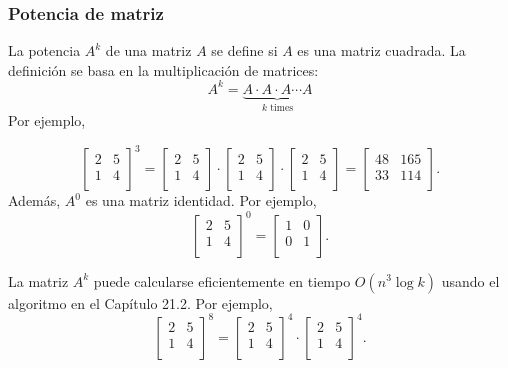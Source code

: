 \subsubsection{Potencia de matriz}


La potencia $A^k$ de una matriz $A$ se define
si $A$ es una matriz cuadrada.
La definición se basa en la multiplicación de matrices:
\[ A^k = \underbrace{A \cdot A \cdot A \cdots A}_{\textrm{$k$ times}} \]
Por ejemplo,

\[
 \begin{bmatrix}
  2 & 5 \\
  1 & 4 \\
 \end{bmatrix}^3 =
 \begin{bmatrix}
  2 & 5 \\
  1 & 4 \\
 \end{bmatrix} \cdot
 \begin{bmatrix}
  2 & 5 \\
  1 & 4 \\
 \end{bmatrix} \cdot
 \begin{bmatrix}
  2 & 5 \\
  1 & 4 \\
 \end{bmatrix} =
 \begin{bmatrix}
  48 & 165 \\
  33 & 114 \\
 \end{bmatrix}.
\]
Además, $A^0$ es una matriz identidad. Por ejemplo,
\[
 \begin{bmatrix}
  2 & 5 \\
  1 & 4 \\
 \end{bmatrix}^0 =
 \begin{bmatrix}
  1 & 0 \\
  0 & 1 \\
 \end{bmatrix}.
\]

La matriz $A^k$ puede calcularse eficientemente
en tiempo $O(n^3 \log k)$ usando el
algoritmo en el Capítulo 21.2. Por ejemplo,
\[
 \begin{bmatrix}
  2 & 5 \\
  1 & 4 \\
 \end{bmatrix}^8 =
 \begin{bmatrix}
  2 & 5 \\
  1 & 4 \\
 \end{bmatrix}^4 \cdot
 \begin{bmatrix}
  2 & 5 \\
  1 & 4 \\
 \end{bmatrix}^4.
\]

